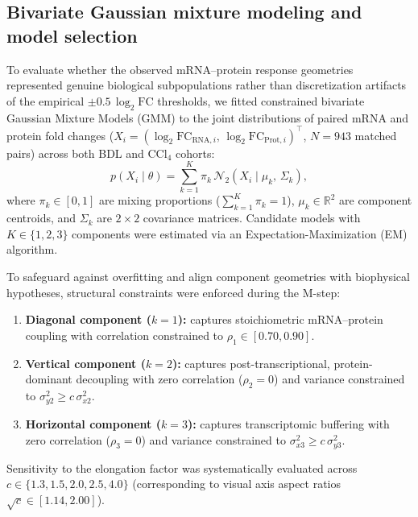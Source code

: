 
\subsection*{Bivariate Gaussian mixture modeling and model selection}
To evaluate whether the observed mRNA--protein response geometries represented genuine biological subpopulations rather than discretization artifacts of the empirical $\pm 0.5\,\log_2\text{FC}$ thresholds, we fitted constrained bivariate Gaussian Mixture Models (GMM) to the joint distributions of paired mRNA and protein fold changes ($X_i = (\log_2\text{FC}_{\text{RNA}, i}, \, \log_2\text{FC}_{\text{Prot}, i})^\top$, $N = 943$ matched pairs) across both BDL and $\text{CCl}_4$ cohorts:
\begin{equation}
p(X_i \mid \theta) = \sum_{k=1}^K \pi_k \, \mathcal{N}_2\left(X_i \mid \mu_k, \, \Sigma_k\right),
\end{equation}
where $\pi_k \in [0, 1]$ are mixing proportions ($\sum_{k=1}^K \pi_k = 1$), $\mu_k \in \mathbb{R}^2$ are component centroids, and $\Sigma_k$ are $2 \times 2$ covariance matrices. Candidate models with $K \in \{1, 2, 3\}$ components were estimated via an Expectation-Maximization (EM) algorithm. 

To safeguard against overfitting and align component geometries with biophysical hypotheses, structural constraints were enforced during the M-step:
\begin{enumerate}
    \item \textbf{Diagonal component ($k=1$):} captures stoichiometric mRNA--protein coupling with correlation constrained to $\rho_1 \in [0.70, 0.90]$.
    \item \textbf{Vertical component ($k=2$):} captures post-transcriptional, protein-dominant decoupling with zero correlation ($\rho_2 = 0$) and variance constrained to $\sigma_{y2}^2 \ge c \, \sigma_{x2}^2$.
    \item \textbf{Horizontal component ($k=3$):} captures transcriptomic buffering with zero correlation ($\rho_3 = 0$) and variance constrained to $\sigma_{x3}^2 \ge c \, \sigma_{y3}^2$.
\end{enumerate}
Sensitivity to the elongation factor was systematically evaluated across $c \in \{1.3, 1.5, 2.0, 2.5, 4.0\}$ (corresponding to visual axis aspect ratios $\sqrt{c} \in [1.14, 2.00]$).


